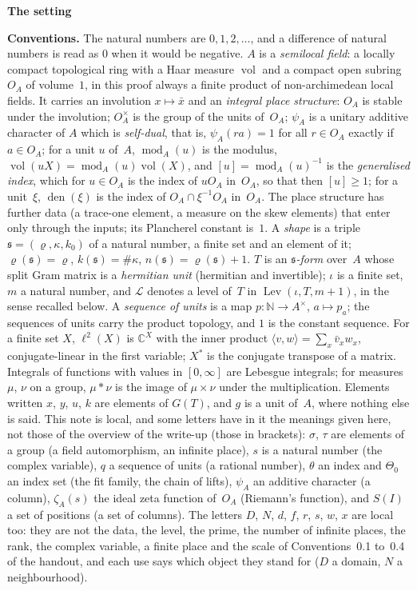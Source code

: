 \documentclass[11pt,a4paper]{article}
\newcommand{\m}[1]{\mbox{$#1$}}        %
\newcommand{\sect}[2]{\refstepcounter{section}\label{#2}\par\addvspace{19pt plus 4pt minus 2pt}\Needspace{7\baselineskip}%
  \noindent\llap{{\fontsize{13.2}{16}\selectfont\bfseries\color{inkfaint}\thesection}\hspace{9pt}}%
  {\fontsize{13.2}{16}\selectfont\bfseries\color{ink}#1}\par\nopagebreak\vspace{-1pt}}
\theoremstyle{plainx}
\theoremstyle{uprightx}
\newenvironment{conventions}{\par\addvspace{5pt}\noindent\textbf{Conventions.}\enspace\ignorespaces}{\par\addvspace{3pt}}
\newcommand{\fs}{\mathfrak{s}}                      %
\newcommand{\cL}{\mathcal{L}}                       %
\newcommand{\rh}[1]{\varrho(#1)}                    %
\newcommand{\kk}[1]{k(#1)}                          %
\newcommand{\nn}[1]{n(#1)}                          %
\newcommand{\GT}[1]{G(#1)}                          %
\newcommand{\gix}[1]{[#1]}                          %
\newcommand{\den}[1]{\operatorname{den}(#1)}        %
\newcommand{\modA}{\operatorname{mod}_A}            %
\newcommand{\zetaA}[1]{\zeta_{A}(#1)}               %
\newcommand{\Levels}[3]{\operatorname{Lev}(#1,#2,#3)} %
\newcommand{\vol}{\operatorname{vol}}
\newcommand{\CC}{\mathbb{C}}
\newcommand{\NN}{\mathbb{N}}
\begin{document}
\sect{The setting}{s:setting}
\begin{conventions}\label{c:conventions}
The natural numbers are \m{0,1,2,\dots}, and a difference of natural numbers is read as $0$ when it would be
negative. $A$ is a \emph{semilocal field}: a locally compact topological ring with a Haar measure \m{\vol} and a
compact open subring $O_A$ of volume~$1$, in this proof always a finite product of non-archimedean local fields.
It carries an involution \m{x\mapsto\bar x} and an \emph{integral place structure}: $O_A$ is stable under the
involution; \m{O_A^{\times}} is the group of the units of~$O_A$; $\psi_A$ is a unitary additive character of $A$
which is \emph{self-dual}, that is, \m{\psi_A(ra)=1} for all \m{r\in O_A} exactly if \m{a\in O_A}; for a unit $u$
of~$A$, \m{\modA(u)} is the modulus, \m{\vol(uX)=\modA(u)\vol(X)}, and \m{\gix{u}=\modA(u)^{-1}} is the
\emph{generalised index}, which for \m{u\in O_A} is the index of $uO_A$ in~$O_A$, so that then \m{\gix{u}\ge1}; for a
unit~$\xi$, \m{\den{\xi}} is the index of \m{O_A\cap\xi^{-1}O_A} in~$O_A$. The place structure has further data (a
trace-one element, a measure on the skew elements) that enter only through the inputs; its Plancherel constant
is~$1$. A \emph{shape} is a triple \m{\fs=(\varrho,\kappa,k_0)} of a natural number, a finite set and an element
of it; \m{\rh{\fs}=\varrho}, \m{\kk{\fs}=\#\kappa}, \m{\nn{\fs}=\rh{\fs}+1}. $T$ is an \emph{$\fs$-form} over~$A$
whose split Gram matrix is a \emph{hermitian unit} (hermitian and invertible); $\iota$ is a finite set, $m$ a
natural number, and $\cL$ denotes a level of~$T$ in \m{\Levels{\iota}{T}{m+1}}, in the sense recalled below. A
\emph{sequence of units} is a map \m{p\colon\NN\to A^{\times}}, \m{a\mapsto p_a}; the sequences of units carry the
product topology, and $1$ is the constant sequence. For a finite set $X$, \m{\ell^2(X)} is \m{\CC^X} with the inner
product \m{\langle v,w\rangle=\sum_x\bar v_xw_x}, conjugate-linear in the first variable; $X^*$ is the conjugate
transpose of a matrix. Integrals of functions with values in \m{[0,\infty]} are Lebesgue integrals; for measures
$\mu$, $\nu$ on a group, \m{\mu*\nu} is the image of \m{\mu\times\nu} under the multiplication. Elements written
$x$, $y$, $u$, $k$ are elements of \m{\GT{T}}, and $g$ is a unit of~$A$, where nothing else is said. This note
is local, and some letters have in it the meanings given here, not those of the overview of the write-up
(those in brackets): $\sigma$, $\tau$ are elements of a group (a field automorphism, an infinite place), $s$ is a
natural number (the complex variable), $q$ a sequence of units (a rational number), $\theta$ an index and
$\Theta_0$ an index set (the fit family, the chain of lifts), $\psi_A$ an additive character (a column),
\m{\zetaA{s}} the ideal zeta function of~$O_A$ (Riemann's function), and \m{S(I)} a set of positions (a set of
columns). The letters $D$, $N$, $d$, $f$, $r$, $s$, $w$, $x$ are local too: they are not the data, the
level, the prime, the number of infinite places, the rank, the complex variable, a finite place and the scale of
Conventions~0.1 to~0.4 of the handout, and each use says which object they stand for ($D$ a domain, $N$ a neighbourhood).
\end{conventions}
\end{document}
